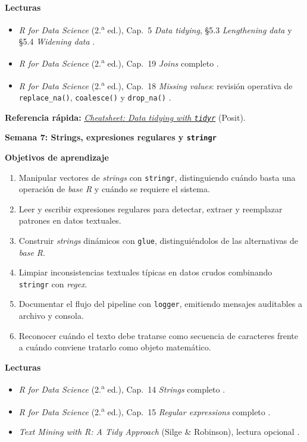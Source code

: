\documentclass[11pt,letterpaper]{article}
\newcommand{\semana}[2]{%
  \bigskip%
  {\color{main}\Large\bfseries Semana #1: #2\par}%
  \smallskip%
}
\newcommand{\cheatsheet}[2]{%
  \href{https://rstudio.github.io/cheatsheets/#1.pdf}{\textit{Cheatsheet: #2}}%
}
\begin{document}
\medskip
\noindent\textbf{Lecturas}
\begin{itemize}[leftmargin=*, itemsep=1pt]
    \item \textit{R for Data Science} (2.\textsuperscript{a} ed.), Cap.\ 5 \textit{Data tidying}, §5.3 \textit{Lengthening data} y §5.4 \textit{Widening data} \cite{wickham2023r4ds}.
    \item \textit{R for Data Science} (2.\textsuperscript{a} ed.), Cap.\ 19 \textit{Joins} completo \cite{wickham2023r4ds}.
    \item \textit{R for Data Science} (2.\textsuperscript{a} ed.), Cap.\ 18 \textit{Missing values}: revisión operativa de \texttt{replace\_na()}, \texttt{coalesce()} y \texttt{drop\_na()} \cite{wickham2023r4ds}.
\end{itemize}

\medskip
\noindent\textbf{Referencia rápida:} \cheatsheet{tidyr}{Data tidying with \texttt{tidyr}} (Posit).

\semana{7}{Strings, expresiones regulares y \texttt{stringr}}

\medskip
\noindent\textbf{Objetivos de aprendizaje}
\begin{enumerate}[leftmargin=*, itemsep=1pt]
    \item Manipular vectores de \textit{strings} con \texttt{stringr}, distinguiendo cuándo basta una operación de \textit{base R} y cuándo se requiere el sistema.
    \item Leer y escribir expresiones regulares para detectar, extraer y reemplazar patrones en datos textuales.
    \item Construir \textit{strings} dinámicos con \texttt{glue}, distinguiéndolos de las alternativas de \textit{base R}.
    \item Limpiar inconsistencias textuales típicas en datos crudos combinando \texttt{stringr} con \textit{regex}.
    \item Documentar el flujo del pipeline con \texttt{logger}, emitiendo mensajes auditables a archivo y consola.
    \item Reconocer cuándo el texto debe tratarse como secuencia de caracteres frente a cuándo conviene tratarlo como objeto matemático.
\end{enumerate}

\medskip
\noindent\textbf{Lecturas}
\begin{itemize}[leftmargin=*, itemsep=1pt]
    \item \textit{R for Data Science} (2.\textsuperscript{a} ed.), Cap.\ 14 \textit{Strings} completo \cite{wickham2023r4ds}.
    \item \textit{R for Data Science} (2.\textsuperscript{a} ed.), Cap.\ 15 \textit{Regular expressions} completo \cite{wickham2023r4ds}.
    \item \textit{Text Mining with R: A Tidy Approach} (Silge \& Robinson), lectura opcional \cite{silge-tidytext}.
\end{itemize}
\end{document}
